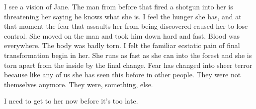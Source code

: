I see a vision of Jane. The man from before that fired a shotgun into her is threatening her saying he knows what she is. I feel the hunger she has, and at that moment the fear that assaults her from being discovered caused her to lose control. She moved on the man and took him down hard and fast. Blood was everywhere. The body was badly torn. I felt the familiar ecstatic pain of final transformation begin in her. She runs as fast as she can into the forest and she is torn apart from the inside by the final change. Fear has changed into sheer terror because like any of us she has seen this before in other people. They were not themselves anymore. They were, something, else.

I need to get to her now before it's too late.


